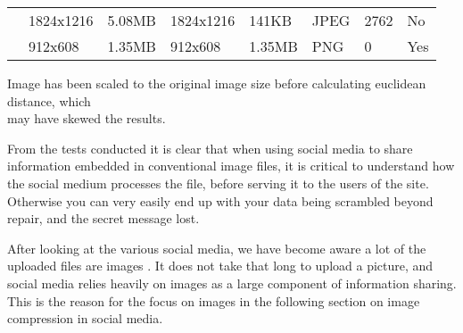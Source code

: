 \begin{table}[]
\begin{tabular}{@{}llllllll@{}}
																& 1824x1216                                                  & 5.08MB                                               & 1824x1216                                                  & 141KB                                                & JPEG											  				   & 2762                                                   & No                                                         \\
																& 912x608                                                    & 1.35MB                                               & 912x608                                                    & 1.35MB                                               & PNG															   & 0                                                      & Yes                                                        \\ \bottomrule
	\end{tabular}
	\begin{tablenotes}
		\footnotesize{\item \textdagger Image has been scaled to the original image size before calculating euclidean distance, which\\ may have skewed the results.}
	\end{tablenotes}
\end{table}
\vspace{12pt}

From the tests conducted it is clear that when using social media to share information embedded in conventional image files, it is critical to understand how the social medium processes the file, before serving it to the users of the site.
Otherwise you can very easily end up with your data being scrambled beyond repair, and the secret message lost.\vspace*{12pt}

\noindent After looking at the various social media, we have become aware a lot of the uploaded files are images \citep{meeker2014internet}.
It does not take that long to upload a picture, and social media relies heavily on images as a large component of information sharing.
This is the reason for the focus on images in the following section on image compression in social media.

